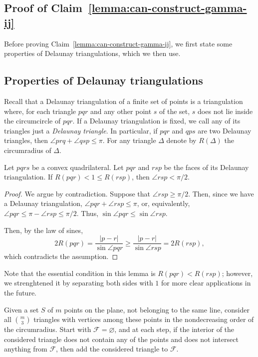 \appendix
\begin{appendices}

\section{Proof of Claim~\ref{lemma:can-construct-gamma-ij}}\label{section:proof-of-claim}

Before proving Claim~\ref{lemma:can-construct-gamma-ij}, we first state some properties of Delaunay triangulations, which we then use.

\subsection{Properties of Delaunay triangulations}

Recall that a Delaunay triangulation of a finite set of points is a triangulation where, for each triangle $pqr$ and any other point $s$ of the set, $s$ does not lie inside the circumcircle of $pqr$. If a Delaunay triangulation is fixed, we call any of its triangles just a \emph{Delaunay triangle}. In particular, if $pqr$ and $qps$ are two Delaunay triangles, then $\angle prq + \angle qsp\leq\pi$. For any triangle $\Delta$ denote by $R(\Delta)$ the circumradius of $\Delta$.

\begin{lemma}\label{lemma:no-obtuse-in-delaunay}
Let $pqrs$ be a convex quadrilateral. Let $pqr$ and $rsp$ be the faces of its Delaunay triangulation. If $R(pqr) < 1 \leq R(rsp)$, then $\angle rsp < \pi/2$.
\end{lemma}

\begin{proof}
We argue by contradiction. Suppose that $\angle rsp \geq \pi/2$. Then, since we have a Delaunay triangulation, $\angle pqr + \angle rsp \leq \pi$, or, equivalently, $\angle pqr \leq \pi - \angle rsp \leq \pi/2$. Thus, $\sin\angle pqr \leq \sin\angle rsp$.

Then, by the law of sines, $$2R(pqr) = \frac{|p - r|}{\sin\angle pqr} \geq \frac{|p - r|}{\sin\angle rsp} = 2R(rsp),$$ which contradicts the assumption.
\end{proof}

Note that the essential condition in this lemma is $R(pqr) < R(rsp)$; however, we strenghtened it by separating both sides with $1$ for more clear applications in the future.

\begin{lemma}\label{lemma:delaunay-sorted-process}
Given a set $S$ of $m$ points on the plane, not belonging to the same line, consider all $\binom{m}{3}$ triangles with vertices among these points in the nondecreasing order of the circumradius. Start with $\mathcal{F} = \varnothing$, and at each step, if the interior of the considered triangle does not contain any of the points and does not intersect anything from $\mathcal{F}$, then add the considered triangle to $\mathcal{F}$.


\end{lemma}
\end{appendices}
